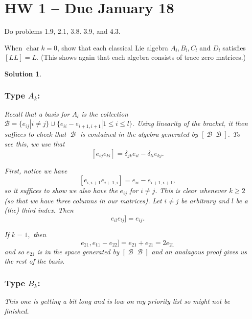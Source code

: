 \documentclass[12pt]{article}
\newenvironment{hwprob}[1]
{\renewcommand{\theprob}{#1}%
 \addtocounter{thm}{-1}%
 \begin{prob}}
{\end{prob}}
\theoremstyle{nonumberbreak}
\newtheorem{sol}{Solution}
\theoremstyle{changebreak}
\theoremstyle{nonumberbreak}
\theoremstyle{change}
\DeclareMathOperator{\ch}{char}
\DeclareMathOperator{\calB}{\mathcal{B}}
\begin{document}
\newpage

\section*{HW 1 -- Due January 18}
Do problems 1.9, 2.1, 3.8. 3.9, and 4.3.

\begin{hwprob}{1.9}
	When $\ch k=0$, show that each classical Lie algebra $A_l,B_l, C_l$ and $D_l$ satisfies $[LL]=L$. (This shows again that each algebra consists of trace zero matrices.)
\end{hwprob}
\begin{sol}
	\subsubsection*{Type $A_k$:}
	Recall that a basis for $A_l$ is the collection $\mathcal{B}=\{e_{ij}|i\ne j\}\cup\{e_{ii}-e_{i+1,i+1}|1\le i\le l\}$. Using linearity of the bracket,
	it then suffices to check that $\calB$ is contained in the algebra generated by $[\calB \calB]$. To see this, we use that
	\[[e_{ij}e_{kl}]=\delta_{jk}e_{il}-\delta_{li}e_{kj}.\]

	First, notice we have
	\[[e_{i,i+1}e_{i+1,i}]=e_{ii}-e_{i+1,i+1},\]
	so it suffices to show we also have the $e_{ij}$ for $i\ne j$.
	This is clear whenever $k\ge 2$ (so that we have three columns in our matrices). Let $i\ne j$ be arbitrary
	and $l$ be a (the) third index. Then 
	\[e_{il}e_{lj}]=e_{ij}.\]

	If $k=1,$ then 
	\[e_{21},e_{11}-e_{22}]=e_{21}+e_{21}=2e_{21}\]
	and so $e_{21}$ is in the space generated by $[\calB \calB]$ and an analagous proof
	gives us the rest of the basis.

	\subsubsection*{Type $B_k$:}
	This one is getting a bit long and is low on my priority list so might not be finished.
\end{sol}
\end{document}
